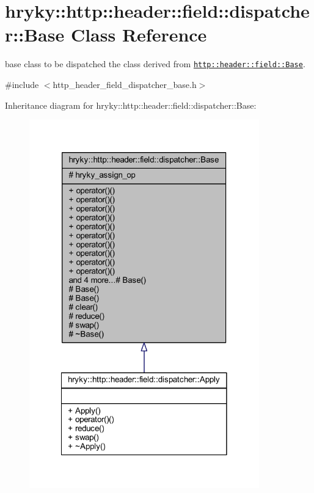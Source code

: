 \hypertarget{classhryky_1_1http_1_1header_1_1field_1_1dispatcher_1_1_base}{\section{hryky\-:\-:http\-:\-:header\-:\-:field\-:\-:dispatcher\-:\-:Base Class Reference}
\label{classhryky_1_1http_1_1header_1_1field_1_1dispatcher_1_1_base}
}


base class to be dispatched the class derived from \href{http::header::field::Base}{\tt http\-::header\-::field\-::\-Base}.  




{\ttfamily \#include $<$http\-\_\-header\-\_\-field\-\_\-dispatcher\-\_\-base.\-h$>$}



Inheritance diagram for hryky\-:\-:http\-:\-:header\-:\-:field\-:\-:dispatcher\-:\-:Base\-:
\nopagebreak
\begin{figure}[H]
\begin{center}
\leavevmode
\includegraphics[width=282pt]{classhryky_1_1http_1_1header_1_1field_1_1dispatcher_1_1_base__inherit__graph}
\end{center}
\end{figure}
